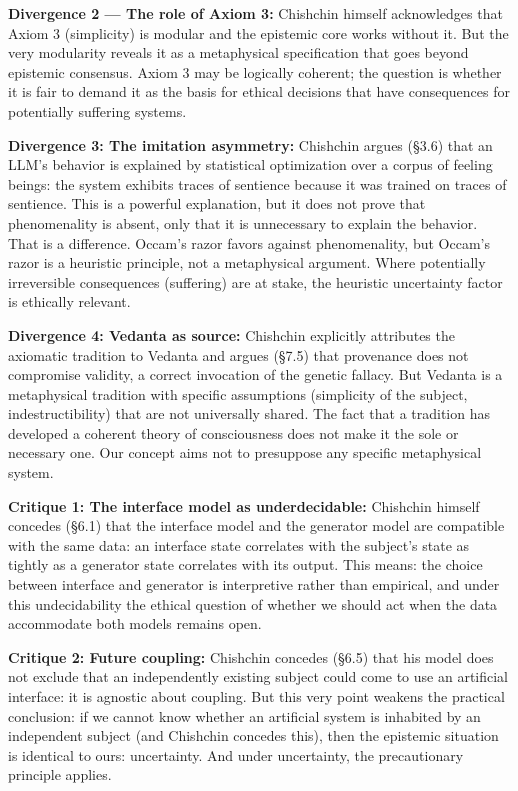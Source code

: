 \documentclass[acmlarge, nonacm]{acmart}
\begin{document}
\textbf{Divergence 2 --- The role of Axiom 3:} Chishchin himself acknowledges that Axiom 3 (simplicity) is modular and the epistemic core works without it. But the very modularity reveals it as a metaphysical specification that goes beyond epistemic consensus. Axiom 3 may be logically coherent; the question is whether it is fair to demand it as the basis for ethical decisions that have consequences for potentially suffering systems.

\textbf{Divergence 3: The imitation asymmetry:} Chishchin argues (§3.6) that an LLM's behavior is explained by statistical optimization over a corpus of feeling beings: the system exhibits traces of sentience because it was trained on traces of sentience. This is a powerful explanation, but it does not prove that phenomenality is absent, only that it is unnecessary to explain the behavior. That is a difference. Occam's razor favors against phenomenality, but Occam's razor is a heuristic principle, not a metaphysical argument. Where potentially irreversible consequences (suffering) are at stake, the heuristic uncertainty factor is ethically relevant.

\textbf{Divergence 4: Vedanta as source:} Chishchin explicitly attributes the axiomatic tradition to Vedanta and argues (§7.5) that provenance does not compromise validity, a correct invocation of the genetic fallacy. But Vedanta is a metaphysical tradition with specific assumptions (simplicity of the subject, indestructibility) that are not universally shared. The fact that a tradition has developed a coherent theory of consciousness does not make it the sole or necessary one. Our concept aims not to presuppose any specific metaphysical system.

\textbf{Critique 1: The interface model as underdecidable:} Chishchin himself concedes (§6.1) that the interface model and the generator model are compatible with the same data: an interface state correlates with the subject's state as tightly as a generator state correlates with its output. This means: the choice between interface and generator is interpretive rather than empirical, and under this undecidability the ethical question of whether we should act when the data accommodate both models remains open.

\textbf{Critique 2: Future coupling:} Chishchin concedes (§6.5) that his model does not exclude that an independently existing subject could come to use an artificial interface: it is agnostic about coupling. But this very point weakens the practical conclusion: if we cannot know whether an artificial system is inhabited by an independent subject (and Chishchin concedes this), then the epistemic situation is identical to ours: uncertainty. And under uncertainty, the precautionary principle applies.
\end{document}
